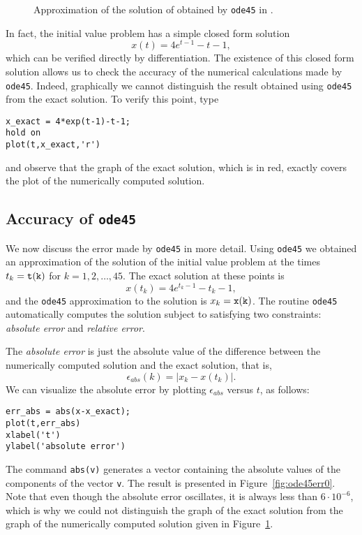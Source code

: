 \documentclass{ximera}
\begin{document}
\begin{figure}[htb]
   \centerline{%
   }
   \caption{Approximation of the solution of
   \protect{} obtained by {\tt ode45} in \protect\Matlabp.}
   \label{fig:ode45ex1}
\end{figure}

In fact, the initial value problem  has a simple closed form 
solution
\[
x(t) = 4e^{t-1}-t-1,
\]
which can be verified directly by differentiation.  The existence of this
closed form solution allows us to check the accuracy of the numerical
calculations made by {\tt ode45}.  Indeed, graphically we cannot distinguish 
the result obtained using {\tt ode45} from the exact 
solution.  To verify this point, type
\begin{verbatim}
x_exact = 4*exp(t-1)-t-1;
hold on
plot(t,x_exact,'r')
\end{verbatim}
and observe that the graph of the exact solution, which is in red, exactly
covers the plot of the numerically computed solution.

\subsection*{Accuracy of {\tt ode45}}

We now discuss the error made by {\tt ode45} in more detail.
Using {\tt ode45} we obtained an approximation of the solution of
the initial value problem  at the times $t_k={\tt t(k)}$
for $k=1,2,\ldots,45$.  The exact solution at these points is
\[
x(t_k)=4e^{t_k-1}-t_k-1,
\]
and the {\tt ode45} approximation to the solution is $x_k={\tt x(k)}$.  The 
routine {\tt ode45} automatically computes the solution subject to satisfying 
two constraints: {\em absolute error} and {\em relative error\/}.

The {\em absolute error} is just the absolute value of
the difference between the numerically computed solution and the exact
solution, that is,
\[
\epsilon_{abs}(k) = |x_k - x(t_k)|.
\]
We can visualize the absolute error by plotting $\epsilon_{abs}$ versus $t$, 
as follows:
\begin{verbatim}
err_abs = abs(x-x_exact);
plot(t,err_abs)
xlabel('t')
ylabel('absolute error')
\end{verbatim}
The \Matlab command {\tt abs(v)} generates a vector containing the absolute 
values of the components of the vector {\tt v}.  The result is presented in 
Figure~\ref{fig:ode45err0}.  Note that even though the absolute error 
oscillates, it is always less than $6\cdot10^{-6}$, which is why we could not 
distinguish the graph of the exact solution from the graph of the numerically 
computed solution given in Figure~\ref{fig:ode45ex1}.
\end{document}
